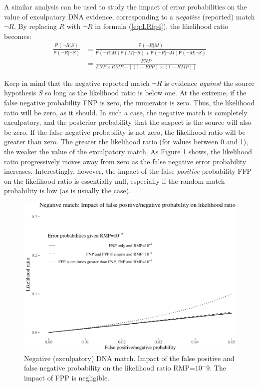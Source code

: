 \documentclass[
  10pt,
  dvipsnames,enabledeprecatedfontcommands]{scrartcl}
\newcommand{\n}{\neg}
\newcommand{\pr}[1]{\mathsf{P}(#1)}
\begin{document}
A similar analysis can be used to study the impact of error
probabilities on the value of exculpatory DNA evidence, corresponding to
a \textit{negative} (reported) match \(\neg R\). By replacing \(R\) with
\(\neg R\) in formula (\ref{eq:LRfp4}), the likelihood ratio becomes:
\begin{align}
\label{eq:LR-match-exc}
\frac{\pr{\neg R \vert S}}{\pr{\neg R \vert \neg S}} & = 
\frac{\pr{\neg R \vert M}}{\pr{\neg R \vert M }\pr{M \vert \n S} + \pr{\neg R \vert \n M}\pr{\n M \vert \n S}}\\
& = \frac{FNP}{FNP\times RMP + [(1-FPP) \times (1-RMP)]}
\end{align}

\noindent Keep in mind that the negative reported match \(\neg R\) is
evidence \textit{against} the source hypothesis \(S\) so long as the
likelihood ratio is below one. At the extreme, if the false negative
probability FNP is zero, the numerator is zero. Thus, the likelihood
ratio will be zero, as it should. In such a case, the negative match is
completely exculpatory, and the posterior probability that the suspect
is the source will also be zero. If the false negative probability is
not zero, the likelihood ratio will be greater than zero. The greater
the likelihood ratio (for values between 0 and 1), the weaker the value
of the exculpatory match. As Figure \ref{fig:fpfnplr-exc} shows, the
likelihood ratio progressively moves away from zero as the false
negative error probability increases. Interestingly, however, the impact
of the false \textit{positive} probability FFP on the likelihood ratio
is essentially null, especially if the random match probability is low
(as is usually the case).

\begin{figure}

\begin{center}\includegraphics[width=1\linewidth]{lr-chapter4_files/figure-latex/fig-fpfnplr-exc-1} \end{center}
\caption{Negative (exculpatory) DNA match. Impact of the false positive and false negative probability on the likelihood ratio RMP=$10{^-9}$. The impact of FPP is negligible.}
\label{fig:fpfnplr-exc}
\end{figure}
\end{document}

